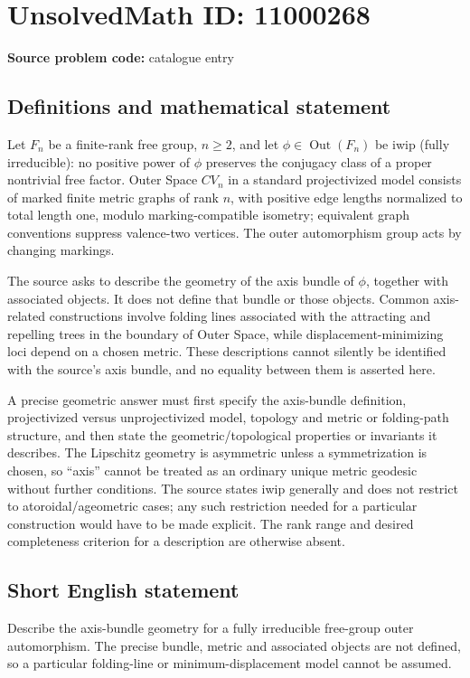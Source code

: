 \documentclass[11pt]{article}
\begin{document}
\section*{UnsolvedMath ID: 11000268}
\textbf{Source problem code:} catalogue entry
\subsection{Definitions and mathematical statement}
Let \(F_n\) be a finite-rank free group, \(n\geq2\), and let \(\phi\in\operatorname{Out}(F_n)\) be iwip (fully irreducible): no positive power of \(\phi\) preserves the conjugacy class of a proper nontrivial free factor. Outer Space \(CV_n\) in a standard projectivized model consists of marked finite metric graphs of rank \(n\), with positive edge lengths normalized to total length one, modulo marking-compatible isometry; equivalent graph conventions suppress valence-two vertices. The outer automorphism group acts by changing markings.

The source asks to describe the geometry of the axis bundle of \(\phi\), together with associated objects. It does not define that bundle or those objects. Common axis-related constructions involve folding lines associated with the attracting and repelling trees in the boundary of Outer Space, while displacement-minimizing loci depend on a chosen metric. These descriptions cannot silently be identified with the source's axis bundle, and no equality between them is asserted here.

A precise geometric answer must first specify the axis-bundle definition, projectivized versus unprojectivized model, topology and metric or folding-path structure, and then state the geometric/topological properties or invariants it describes. The Lipschitz geometry is asymmetric unless a symmetrization is chosen, so ``axis'' cannot be treated as an ordinary unique metric geodesic without further conditions. The source states iwip generally and does not restrict to atoroidal/ageometric cases; any such restriction needed for a particular construction would have to be made explicit. The rank range and desired completeness criterion for a description are otherwise absent.
\subsection{Short English statement}
Describe the axis-bundle geometry for a fully irreducible free-group outer automorphism. The precise bundle, metric and associated objects are not defined, so a particular folding-line or minimum-displacement model cannot be assumed.
\end{document}
